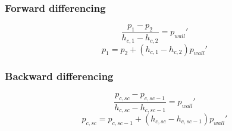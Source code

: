 \documentclass[11pt]{article}
\begin{document}
\subsubsection{Forward differencing}
\begin{equation}
	\frac{p_1-p_2}{h_{c,1}-h_{c,2}} = p_{wall}'
\end{equation}
\begin{equation}
	p_1 = p_2 + (h_{c,1} - h_{c,2}) p_{wall}'
\end{equation}
\subsubsection{Backward differencing}
\begin{equation}
	\frac{p_{c,sc}-p_{c,sc-1}}{h_{c,sc}-h_{c,sc-1}} = p_{wall}'
\end{equation}
\begin{equation}
	p_{c,sc} = p_{c,sc-1} + (h_{c,sc} - h_{c,sc-1}) p_{wall}'
\end{equation}
\end{document}
